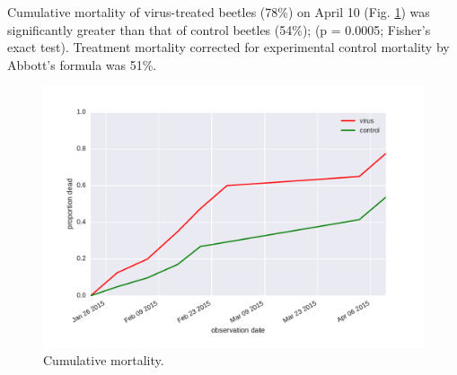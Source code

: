 \documentclass[letterpaper,11pt]{scrartcl}
\begin{document}
Cumulative mortality of virus-treated beetles (78\%) on April 10 (Fig. \ref{mortality}) was significantly greater than that of 
control beetles (54\%); (p = 0.0005; Fisher's exact test). Treatment mortality corrected for experimental control mortality by Abbott's 
formula was 51\%.

 
\begin{figure}
\centering
\includegraphics[width = \textwidth]{wb1_mortality.pdf}
\caption{Cumulative mortality.}
\label{mortality}
\end{figure} 
 
 
%
%
\end{document}
